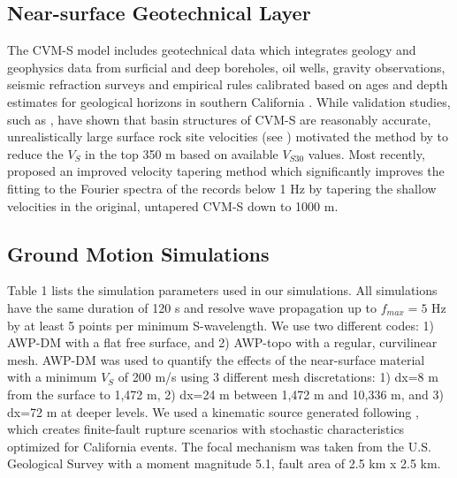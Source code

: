 \subsection{Near-surface Geotechnical Layer}
The CVM-S model includes geotechnical data which integrates geology and geophysics data from surficial and deep boreholes, oil wells, gravity observations, seismic refraction surveys and empirical rules calibrated based on ages and depth estimates for geological horizons in southern California . While validation studies, such as \citet{tabordaEvaluationSouthernCalifornia2016}, have shown that basin structures of CVM-S are reasonably accurate, unrealistically large surface rock site velocities (see ) motivated the method by \citet{elyVs30derivedNearsurfaceSeismic2010} to reduce the $V_S$ in the top 350 m based on available $V_{S30}$ values. Most recently, \citet{huCalibrationNearsurfaceSeismic2021} proposed an improved velocity tapering method  which significantly improves the fitting to the Fourier spectra of the records below 1 Hz by tapering the shallow velocities in the original, untapered CVM-S down to 1000 m.

\subsection{Ground Motion Simulations}
Table 1 lists the simulation parameters used in our simulations. All simulations have the same duration of 120 s and resolve wave propagation up to $f_{max}=5$ Hz by at least 5 points per minimum S-wavelength. We use two different codes: 1) AWP-DM with a flat free surface, and 2) AWP-topo with a regular, curvilinear mesh. AWP-DM was used to quantify the effects of the near-surface material with a minimum $V_S$ of 200 m/s using 3 different mesh discretations: 1) dx=8 m from the surface to 1,472 m, 2) dx=24 m between 1,472 m and 10,336 m, and 3) dx=72 m at deeper levels. We used a kinematic source generated following \citet{gravesKinematicGroundMotion2016}, which creates finite-fault rupture scenarios with stochastic characteristics optimized for California events. The focal mechanism was taken from the U.S. Geological Survey \citep[strike=233°, dip=77°, rake=49°; ][]{usgsEarthquakeEventsFocal2014} with a moment magnitude 5.1, fault area of 2.5 km x 2.5 km.

